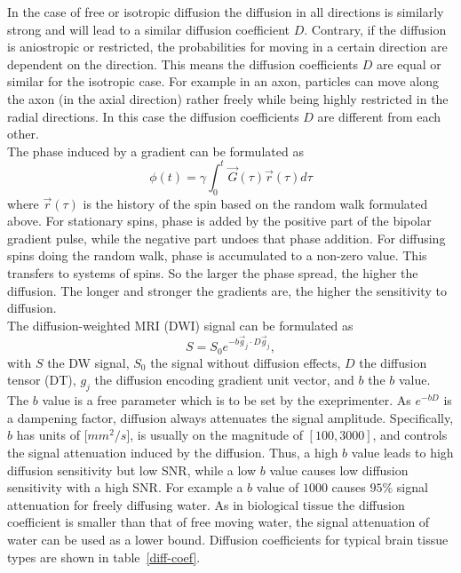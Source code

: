 In the case of free or isotropic diffusion the diffusion in all directions is similarly strong and will lead to a similar diffusion coefficient $D$.
Contrary, if the diffusion is aniostropic or restricted, the probabilities for moving in a certain direction are dependent on the direction.
This means the diffusion coefficients $D$ are equal or similar for the isotropic case.
For example in an axon, particles can move along the axon (in the axial direction) rather freely while being highly restricted in the radial directions.
In this case the diffusion coefficients $D$ are different from each other. \\

The phase induced by a gradient can be formulated as
\[ \phi (t) = \gamma \int_0^t \overrightarrow{G}(\tau) \overrightarrow{r}(\tau) d \tau \]
where $\overrightarrow{r}(\tau)$ is the history of the spin based on the random walk formulated above.
For stationary spins, phase is added by the positive part of the bipolar gradient pulse, while the negative part undoes that phase addition.
For diffusing spins doing the random walk, phase is accumulated to a non-zero value.
This transfers to systems of spins.
So the larger the phase spread, the higher the diffusion.
The longer and stronger the gradients are, the higher the sensitivity to diffusion. \\

The diffusion-weighted MRI (DWI) signal can be formulated as
\[ S = S_0 e^{-b \overrightarrow{g}_j \cdot D \overrightarrow{g}_j}, \]
with $S$ the DW signal, $S_0$ the signal without diffusion effects, $D$ the diffusion tensor (DT), $g_j$ the diffusion encoding gradient unit vector, and $b$ the $b$ value. \\
The $b$ value is a free parameter which is to be set by the exeprimenter.
As $e^{-bD}$ is a dampening factor, diffusion always attenuates the signal amplitude.
Specifically, $b$ has units of [$mm^2 / s$], is usually on the magnitude of $[100, 3000]$, and controls the signal attenuation induced by the diffusion.
Thus, a high $b$ value leads to high diffusion sensitivity but low SNR, while a low $b$ value causes low diffusion sensitivity with a high SNR.
For example a $b$ value of $1000$ causes $95\%$ signal attenuation for freely diffusing water.
As in biological tissue the diffusion coefficient is smaller than that of free moving water, the signal attenuation of water can be used as a lower bound.
Diffusion coefficients for typical brain tissue types are shown in table~\ref{diff-coef}.

